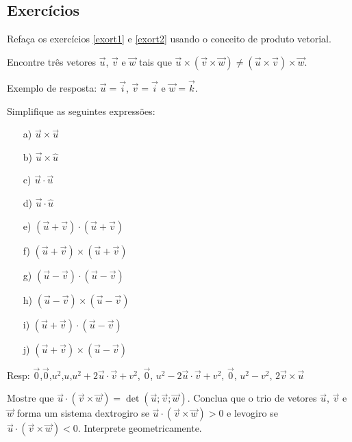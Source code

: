 \construirExeresol
\subsection*{Exercícios}

\construirExer



\begin{exer} Refaça os exercícios \ref{exort1} e \ref{exort2} usando o conceito de produto vetorial.
\end{exer}

\begin{exer}\label{prodvecnaoassoc} Encontre três vetores $\vec{u}$, $\vec{v}$ e $\vec{w}$ tais que $\vec{u}\times\left(\vec{v}\times\vec{w}\right)\neq \left(\vec{u}\times\vec{v}\right)\times \vec{w}$.
\end{exer}
Exemplo de resposta: $\vec{u}=\vec{i}$, $\vec{v}=\vec{i}$ e $\vec{w}=\vec{k}$.

\begin{exer} Simplifique as seguintes expressões:
\begin{itemize}
\item[a)] $\vec{u}\times\vec{u}$
\item[b)] $\vec{u}\times\hat{u}$
\item[c)] $\vec{u}\cdot\vec{u}$
\item[d)] $\vec{u}\cdot\hat{u}$
\item[e)] $\left(\vec{u}+\vec{v}\right)\cdot\left(\vec{u}+\vec{v}\right)$
\item[f)] $\left(\vec{u}+\vec{v}\right)\times\left(\vec{u}+\vec{v}\right)$
\item[g)] $\left(\vec{u}-\vec{v}\right)\cdot\left(\vec{u}-\vec{v}\right)$
\item[h)] $\left(\vec{u}-\vec{v}\right)\times\left(\vec{u}-\vec{v}\right)$
\item[i)] $\left(\vec{u}+\vec{v}\right)\cdot\left(\vec{u}-\vec{v}\right)$
\item[j)] $\left(\vec{u}+\vec{v}\right)\times\left(\vec{u}-\vec{v}\right)$
\end{itemize}
\end{exer}
Resp: $\vec{0}$,$\vec{0}$,$u^2$,$u$,$u^2+2\vec{u}\cdot\vec{v}+v^2$, $\vec{0}$, $u^2-2\vec{u}\cdot\vec{v}+v^2$, $\vec{0}$, $u^2-v^2$, $2\vec{v}\times\vec{u}$


\begin{exer} Mostre que $\vec{u}\cdot \left(\vec{v}\times\vec{w}\right)=\det\left(\vec{u};\vec{v};\vec{w}\right)$. Conclua que o trio de vetores $\vec{u}$, $\vec{v}$ e $\vec{w}$ forma um sistema dextrogiro se $\vec{u}\cdot \left(\vec{v}\times\vec{w}\right)>0$ e levogiro se $\vec{u}\cdot \left(\vec{v}\times\vec{w}\right)<0$. Interprete geometricamente.
\end{exer}

